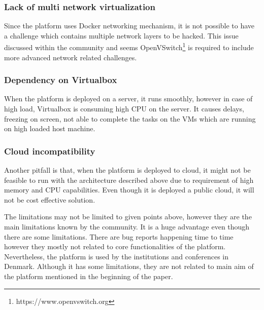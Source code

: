 \subsubsection{Lack of multi network virtualization}

Since the platform uses Docker networking mechanism, it is not possible to have a challenge which contains multiple network layers to be hacked. This issue discussed within the community and seems OpenVSwitch\footnote{https://www.openvswitch.org} is required to include more advanced network related challenges. 

\subsubsection{Dependency on Virtualbox}
When the platform is deployed on a server, it runs smoothly, however in case of high load, Virtualbox is consuming high CPU on the server. It causes delays, freezing on screen, not able to complete the tasks on the VMs which are running on high loaded host machine. 
\subsubsection{Cloud incompatibility}
Another pitfall is that, when the platform is deployed to cloud, it might not be feasible to run with the architecture described above due to requirement of high memory and CPU capabilities. Even though it is deployed a public cloud, it will not be cost effective solution. 
\newline

The limitations may not be limited to given points above, however they are the main limitations known by the community. It is a huge advantage even though there are some limitations. 
There are bug reports happening time to time however they mostly not related to core functionalities of the platform. 
Nevertheless, the platform is used by the institutions and conferences in Denmark. Although it has some limitations, they are not related to main aim of the platform mentioned in the beginning of the paper. 
